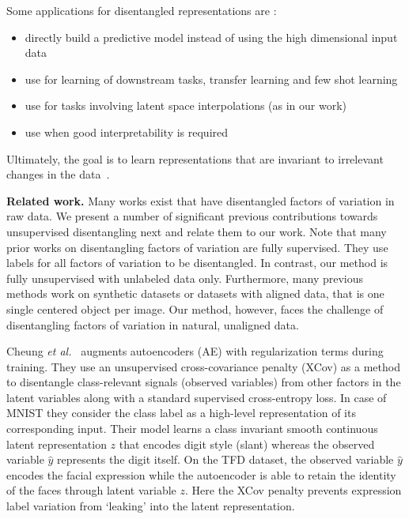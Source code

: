 \documentclass[12pt,a4paper]{article}
\begin{document}
Some applications for disentangled representations are \cite{ChallengeAssLofDisRepr}:
\begin{itemize}
  \item directly build a predictive model instead of using the high dimensional input data
  \item use for learning of downstream tasks, transfer learning and few shot learning
  \item use for tasks involving latent space interpolations (as in our work)
  \item use when good interpretability is required
\end{itemize}
Ultimately, the goal is to learn representations that are invariant to irrelevant changes in the data~\cite{FwkQuantEvalDisRep}.

\par \textbf{Related work.} Many works exist that have disentangled factors of variation in raw data. We present a number of significant previous contributions towards unsupervised disentangling next and relate them to our work. Note that many prior works on disentangling factors of variation are fully supervised. They use labels for all factors of variation to be disentangled. In contrast, our method is fully unsupervised with unlabeled data only. Furthermore, many previous methods work on synthetic datasets or datasets with aligned data, that is one single centered object per image. Our method, however, faces the challenge of disentangling factors of variation in natural, unaligned data.


\par Cheung \textit{et al.}~\cite{DiscHiddenFoViDN} augments autoencoders (AE) with regularization terms during training. They use an unsupervised cross-covariance penalty (XCov) as a method to disentangle class-relevant signals (observed variables) from other factors in the latent variables along with a standard supervised cross-entropy loss. In case of MNIST they consider the class label as a high-level representation of its corresponding input. Their model learns a class invariant smooth continuous latent representation $z$ that encodes digit style (slant) whereas the observed variable $\hat{y}$ represents the digit itself. On the TFD dataset, the observed variable $\hat{y}$ encodes the facial expression while the autoencoder is able to retain the identity of the faces through latent variable $z$. Here the XCov penalty prevents expression label variation from ‘leaking’ into the latent representation.
\end{document}
